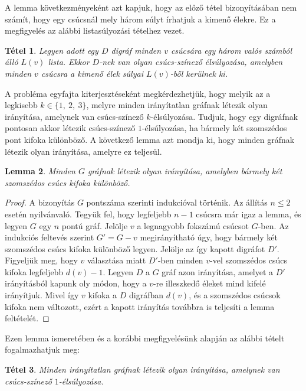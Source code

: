 \documentclass[12pt, a4paper]{report}
\newtheorem{tét}{Tétel}[section]
\newtheorem{lem}[tét]{Lemma}
\theoremstyle{remark}
\theoremstyle{definition}
\begin{document}
A lemma következményeként azt kapjuk, hogy az előző tétel bizonyításában nem számít, hogy egy csúcsnál mely három súlyt írhatjuk a kimenő élekre. Ez a megfigyelés az alábbi listasúlyozási tételhez vezet.

\begin{tét}
Legyen adott egy $D$ digráf minden $v$ csúcsára egy három valós számból álló $L(v)$ lista. Ekkor $D$-nek van olyan csúcs-színező élsúlyozása, amelyben minden $v$ csúcsra a kimenő élek súlyai $L(v)$-ből kerülnek ki.
\end{tét}

A probléma egyfajta kiterjesztéseként megkérdezhetjük, hogy melyik az a legkisebb $k \in \lbrace 1,\ 2,\ 3 \rbrace$, melyre minden irányítatlan gráfnak létezik olyan irányítása, amelynek van csúcs-színező $k$-élsúlyozása. Tudjuk, hogy egy digráfnak pontosan akkor létezik csúcs-színező $1$-élsúlyozása, ha bármely két szomszédos pont kifoka különböző. A következő lemma azt mondja ki, hogy minden gráfnak létezik olyan irányítása, amelyre ez teljesül.

\begin{lem}
Minden $G$ gráfnak létezik olyan irányítása, amelyben bármely két szomszédos csúcs kifoka különböző.
\end{lem}

\begin{proof}
A bizonyítás $G$ pontszáma szerinti indukcióval történik. Az állítás $n \leq 2$ esetén nyilvánvaló. Tegyük fel, hogy legfeljebb $n - 1$ csúcsra már igaz a lemma, és legyen $G$ egy $n$ pontú gráf. Jelölje $v$ a legnagyobb fokszámú csúcsot $G$-ben. Az indukciós feltevés szerint $G' = G - v$ megirányítható úgy, hogy bármely két szomszédos csúcs kifoka különböző legyen. Jelölje az így kapott digráfot $D'$. Figyeljük meg, hogy $v$ választása miatt $D'$-ben minden $v$-vel szomszédos csúcs kifoka legfeljebb $d(v) - 1$. Legyen $D$ a $G$ gráf azon irányítása, amelyet a $D'$ irányításból kapunk oly módon, hogy a $v$-re illeszkedő éleket mind kifelé irányítjuk. Mivel így $v$ kifoka a $D$ digráfban $d(v)$, és a szomszédos csúcsok kifoka nem változott, ezért a kapott irányítás továbbra is teljesíti a lemma feltételét.
\end{proof}

Ezen lemma ismeretében és a korábbi megfigyelésünk alapján az alábbi tételt fogalmazhatjuk meg:

\begin{tét}
Minden irányítatlan gráfnak létezik olyan irányítása, amelynek van csúcs-színező $1$-élsúlyozása.
\end{tét}
\end{document}
